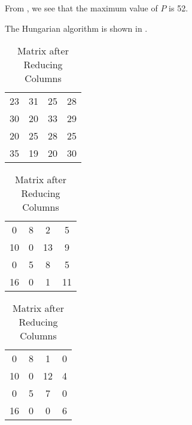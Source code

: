 \begin{subquestions}
\begin{subsubquestions}
From , we see that the maximum value of $P$ is 52.

\end{subsubquestions}


\subquestion

\begin{subsubquestions}
	
\subsubquestion

The Hungarian algorithm is shown in .

\begin{table}[!hbt]
	\begin{minipage}{0.3\textwidth}
		\centering
		\begin{tabular}{cccc}
			23 & 31 & 25 & 28 \\
			30 & 20 & 33 & 29 \\
			20 & 25 & 28 & 25 \\
			35 & 19 & 20 & 30 \\
		\end{tabular}
		\captionsetup{width=1.1\linewidth}
		\caption*{Matrix From question}
	\end{minipage}
	\hspace{20pt}
	\begin{minipage}{0.3\textwidth}
		\centering
		\begin{tabular}{cccc}
			0 & 8 & 2 & 5 \\
		   10 & 0 & 13 & 9 \\
			0 & 5 & 8 & 5 \\
		   16 & 0 & 1 & 11 \\
		\end{tabular}
		\captionsetup{width=1.1\linewidth}
		\caption*{Matrix after Reducing Rows}
	\end{minipage}
	\hspace{20pt}
	\begin{minipage}{0.3\textwidth}
		\centering
		\begin{tabular}{cccc}
			0 & 8 & 1 & 0 \\
		   10 & 0 & 12 & 4 \\
			0 & 5 & 7 & 0 \\
		   16 & 0 & 0 & 6 \\
		\end{tabular}
		\captionsetup{width=1.1\linewidth}
		\caption*{Matrix after Reducing Columns} 
	\end{minipage}
	

\end{table}
\end{subsubquestions}
\end{subquestions}
